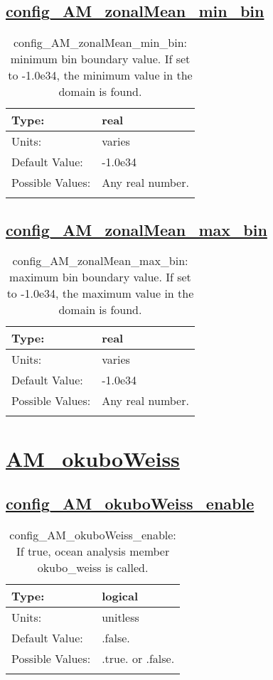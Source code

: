 \subsection[config\_AM\_zonalMean\_min\_bin]{\hyperref[sec:nm_tab_AM_zonalMean]{config\_AM\_zonalMean\_min\_bin}}
\label{subsec:nm_sec_config_AM_zonalMean_min_bin}
\begin{center}
\begin{longtable}{| p{2.0in} || p{4.0in} |}
    \hline
    Type: & real \\
    \hline
    Units: & \si{varies} \\
    \hline
    Default Value: & -1.0e34 \\
    \hline
    Possible Values: & Any real number. \\
    \hline
    \caption{config\_AM\_zonalMean\_min\_bin: minimum bin boundary value.  If set to -1.0e34, the minimum value in the domain is found.}
\end{longtable}
\end{center}
\subsection[config\_AM\_zonalMean\_max\_bin]{\hyperref[sec:nm_tab_AM_zonalMean]{config\_AM\_zonalMean\_max\_bin}}
\label{subsec:nm_sec_config_AM_zonalMean_max_bin}
\begin{center}
\begin{longtable}{| p{2.0in} || p{4.0in} |}
    \hline
    Type: & real \\
    \hline
    Units: & \si{varies} \\
    \hline
    Default Value: & -1.0e34 \\
    \hline
    Possible Values: & Any real number. \\
    \hline
    \caption{config\_AM\_zonalMean\_max\_bin: maximum bin boundary value.  If set to -1.0e34, the maximum value in the domain is found.}
\end{longtable}
\end{center}
\section[AM\_okuboWeiss]{\hyperref[sec:nm_tab_AM_okuboWeiss]{AM\_okuboWeiss}}
\label{sec:nm_sec_AM_okuboWeiss}
\subsection[config\_AM\_okuboWeiss\_enable]{\hyperref[sec:nm_tab_AM_okuboWeiss]{config\_AM\_okuboWeiss\_enable}}
\label{subsec:nm_sec_config_AM_okuboWeiss_enable}
\begin{center}
\begin{longtable}{| p{2.0in} || p{4.0in} |}
    \hline
    Type: & logical \\
    \hline
    Units: & \si{unitless} \\
    \hline
    Default Value: & .false. \\
    \hline
    Possible Values: & .true. or .false. \\
    \hline
    \caption{config\_AM\_okuboWeiss\_enable: If true, ocean analysis member okubo\_weiss is called.}
\end{longtable}
\end{center}
